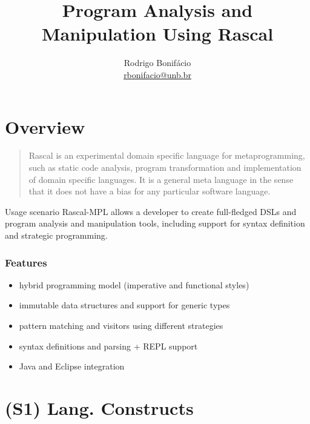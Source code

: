 \documentclass{beamer}
\title{Program Analysis and Manipulation Using Rascal}
\author{Rodrigo Bonif\'{a}cio \\ \url{rbonifacio@unb.br}}
\begin{document}
\begin{frame}
\titlepage
\end{frame}

\section{Overview}

\begin{frame}
  \begin{quote}
Rascal is an experimental domain specific language for metaprogramming, such as static code analysis, program transformation and implementation of domain specific languages. It is a general meta language in the sense that it does not have a bias for any particular software language.
  \end{quote}
\end{frame}

\begin{frame}
  \begin{block}{Usage scenario}
    Rascal-MPL allows a developer
    to create full-fledged DSLs and program
    analysis and manipulation tools,
    including support for syntax
    definition and strategic programming. 
  \end{block}
\end{frame}

\begin{frame}
  \frametitle{Features}

  \begin{itemize}
    \item hybrid programming model (imperative and functional styles)
    \item immutable data structures and support for generic types
    \item pattern matching and visitors using different strategies
    \item syntax definitions and parsing + REPL support  
    \item Java and Eclipse integration  
  \end{itemize}  
\end{frame}

\begin{frame}
\tableofcontents
\end{frame}

\section{(S1) Lang. Constructs}
\end{document}
